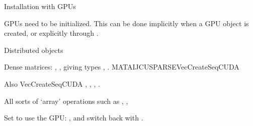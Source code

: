
 {Installation with GPUs}

GPUs need to be initialized.
This can be done implicitly when a GPU object is created,
or explicitly through .

 {Distributed objects}

Dense matrices:
,
,
giving types
,
.
MATAIJCUSPARSEVecCreateSeqCUDA

Also
VecCreateSeqCUDA
,
,
,
.

All sorts of `array' operations such as
,
,

Set  to use the GPU:
,
and switch back with
.
